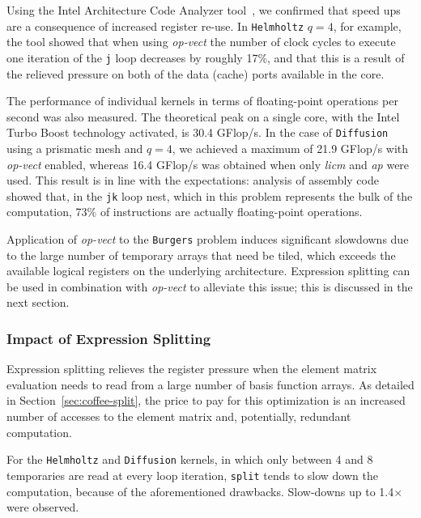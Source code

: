Using the Intel Architecture Code Analyzer tool~\citep{IACA}, we confirmed that speed ups are a consequence of increased register re-use. In {\tt Helmholtz} $q=4$, for example, the tool showed that when using \emph{op-vect} the number of clock cycles to execute one iteration of the \texttt{j} loop decreases by roughly 17$\%$, and that this is a result of the relieved pressure on both of the data (cache) ports available in the core.

The performance of individual kernels in terms of floating-point operations per second was also measured. The theoretical peak on a single core, with the Intel Turbo Boost technology activated, is 30.4 GFlop/s. In the case of {\tt Diffusion} using a prismatic mesh and $q=4$, we achieved a maximum of 21.9 GFlop/s with \emph{op-vect} enabled, whereas 16.4 GFlop/s was obtained when only \emph{licm} and \emph{ap} were used. This result is in line with the expectations: analysis of assembly code showed that, in the \texttt{jk} loop nest, which in this problem represents the bulk of the computation, 73$\%$ of instructions are actually floating-point operations.

Application of \emph{op-vect} to the {\tt Burgers} problem induces significant slowdowns due to the large number of temporary arrays that need be tiled, which exceeds the available logical registers on the underlying architecture. Expression splitting can be used in combination with \emph{op-vect} to alleviate this issue; this is discussed in the next section.


\subsubsection{Impact of Expression Splitting}
\label{sec:perf-results-split} 
Expression splitting relieves the register pressure when the element matrix evaluation needs to read from a large number of basis function arrays. As detailed in Section~\ref{sec:coffee-split}, the price to pay for this optimization is an increased number of accesses to the element matrix and, potentially, redundant computation. 

For the {\tt Helmholtz} and {\tt Diffusion} kernels, in which only between 4 and 8 temporaries are read at every loop iteration, \texttt{split} tends to slow down the computation, because of the aforementioned drawbacks. Slow-downs up to 1.4$\times$ were observed. 


